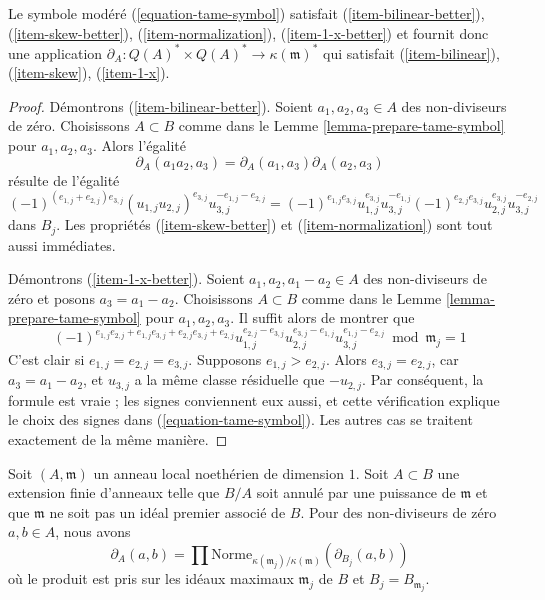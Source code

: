 \begin{lemma}
\label{lemma-tame-symbol}
Le symbole modéré (\ref{equation-tame-symbol}) satisfait
(\ref{item-bilinear-better}), (\ref{item-skew-better}),
(\ref{item-normalization}), (\ref{item-1-x-better}) et fournit donc
une application $\partial_A : Q(A)^* \times Q(A)^* \to \kappa(\mathfrak m)^*$
qui satisfait (\ref{item-bilinear}), (\ref{item-skew}), (\ref{item-1-x}).
\end{lemma}

\begin{proof}
Démontrons (\ref{item-bilinear-better}).
Soient $a_1, a_2, a_3 \in A$ des non-diviseurs de zéro.
Choisissons $A \subset B$ comme dans le Lemme \ref{lemma-prepare-tame-symbol}
pour $a_1, a_2, a_3$. Alors l'égalité
$$
\partial_A(a_1a_2, a_3) = \partial_A(a_1, a_3) \partial_A(a_2, a_3)
$$
résulte de l'égalité
$$
(-1)^{(e_{1, j} + e_{2, j})e_{3, j}}
(u_{1, j}u_{2, j})^{e_{3, j}}u_{3, j}^{-e_{1, j} - e_{2, j}} =
(-1)^{e_{1, j}e_{3, j}}
u_{1, j}^{e_{3, j}}u_{3, j}^{-e_{1, j}}
(-1)^{e_{2, j}e_{3, j}}
u_{2, j}^{e_{3, j}}u_{3, j}^{-e_{2, j}}
$$
dans $B_j$. Les propriétés (\ref{item-skew-better}) et
(\ref{item-normalization}) sont tout aussi immédiates.

\medskip\noindent
Démontrons (\ref{item-1-x-better}). Soient $a_1, a_2, a_1 - a_2 \in A$
des non-diviseurs de zéro et posons $a_3 = a_1 - a_2$.
Choisissons $A \subset B$ comme dans le Lemme \ref{lemma-prepare-tame-symbol}
pour $a_1, a_2, a_3$. Il suffit alors de montrer que
$$
(-1)^{e_{1, j}e_{2, j} + e_{1, j}e_{3, j} + e_{2, j}e_{3, j} + e_{2, j}}
u_{1, j}^{e_{2, j} - e_{3, j}}
u_{2, j}^{e_{3, j} - e_{1, j}}
u_{3, j}^{e_{1, j} - e_{2, j}} \bmod \mathfrak m_j = 1
$$
C'est clair si $e_{1, j} = e_{2, j} = e_{3, j}$.
Supposons $e_{1, j} > e_{2, j}$. Alors $e_{3, j} = e_{2, j}$,
car $a_3 = a_1 - a_2$, et $u_{3, j}$
a la même classe résiduelle que $-u_{2, j}$. Par conséquent,
la formule est vraie ; les signes conviennent eux aussi,
et cette vérification explique le choix des signes
dans (\ref{equation-tame-symbol}).
Les autres cas se traitent exactement de la même manière.
\end{proof}

\begin{lemma}
\label{lemma-norm-down-tame-symbol}
Soit $(A, \mathfrak m)$ un anneau local noethérien de dimension $1$.
Soit $A \subset B$ une extension finie d'anneaux telle que $B/A$
soit annulé par une puissance de $\mathfrak m$ et que $\mathfrak m$ ne soit pas
un idéal premier associé de $B$.
Pour des non-diviseurs de zéro $a, b \in A$, nous avons
$$
\partial_A(a, b) = \prod
\text{Norme}_{\kappa(\mathfrak m_j)/\kappa(\mathfrak m)}(\partial_{B_j}(a, b))
$$
où le produit est pris sur les idéaux maximaux $\mathfrak m_j$ de $B$
et $B_j = B_{\mathfrak m_j}$.
\end{lemma}


